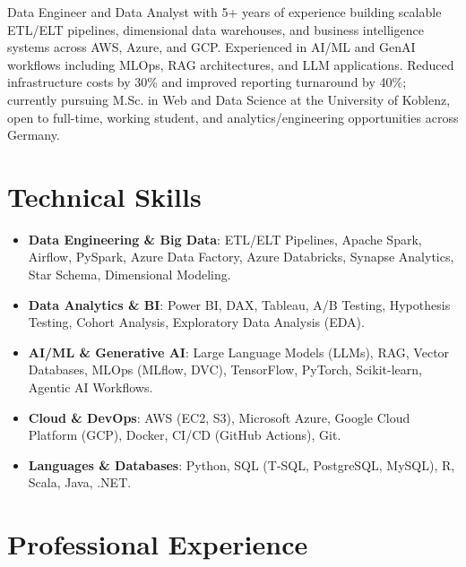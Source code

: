 \documentclass[11pt,a4paper,sans]{moderncv}
\begin{document}
\makecvtitle
\vspace{-12pt}

{\raggedright\small Data Engineer and Data Analyst with 5+ years of experience building scalable ETL/ELT pipelines, dimensional data warehouses, and business intelligence systems across AWS, Azure, and GCP. Experienced in AI/ML and GenAI workflows including MLOps, RAG architectures, and LLM applications. Reduced infrastructure costs by 30\% and improved reporting turnaround by 40\%; currently pursuing M.Sc. in Web and Data Science at the University of Koblenz, open to full-time, working student, and analytics/engineering opportunities across Germany.\par}

\section{Technical Skills}
\vspace{1pt}
\begin{itemize}
\item \textbf{Data Engineering \& Big Data}: ETL/ELT Pipelines, Apache Spark, Airflow, PySpark, Azure Data Factory, Azure Databricks, Synapse Analytics, Star Schema, Dimensional Modeling.
\item \textbf{Data Analytics \& BI}: Power BI, DAX, Tableau, A/B Testing, Hypothesis Testing, Cohort Analysis, Exploratory Data Analysis (EDA).
\item \textbf{AI/ML \& Generative AI}: Large Language Models (LLMs), RAG, Vector Databases, MLOps (MLflow, DVC), TensorFlow, PyTorch, Scikit-learn, Agentic AI Workflows.
\item \textbf{Cloud \& DevOps}: AWS (EC2, S3), Microsoft Azure, Google Cloud Platform (GCP), Docker, CI/CD (GitHub Actions), Git.
\item \textbf{Languages \& Databases}: Python, SQL (T-SQL, PostgreSQL, MySQL), R, Scala, Java, .NET.
\end{itemize}

\section{Professional Experience}
\vspace{2pt}
\end{document}
